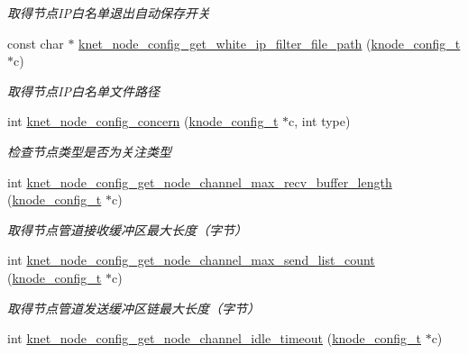 \begin{DoxyCompactItemize}
\begin{DoxyCompactList}\small\item\em 取得节点\+I\+P白名单退出自动保存开关 \end{DoxyCompactList}\item 
const char $\ast$ \hyperlink{a00105_a9988701f828169b05138ec5cfd7b2016_a9988701f828169b05138ec5cfd7b2016}{knet\+\_\+node\+\_\+config\+\_\+get\+\_\+white\+\_\+ip\+\_\+filter\+\_\+file\+\_\+path} (\hyperlink{a00066_af1cfaee0eb1c76ebf06076b95cc47ee1_af1cfaee0eb1c76ebf06076b95cc47ee1}{knode\+\_\+config\+\_\+t} $\ast$c)
\begin{DoxyCompactList}\small\item\em 取得节点\+I\+P白名单文件路径 \end{DoxyCompactList}\item 
int \hyperlink{a00105_a255581334b8d1d5a530374c4e979d941_a255581334b8d1d5a530374c4e979d941}{knet\+\_\+node\+\_\+config\+\_\+concern} (\hyperlink{a00066_af1cfaee0eb1c76ebf06076b95cc47ee1_af1cfaee0eb1c76ebf06076b95cc47ee1}{knode\+\_\+config\+\_\+t} $\ast$c, int type)
\begin{DoxyCompactList}\small\item\em 检查节点类型是否为关注类型 \end{DoxyCompactList}\item 
int \hyperlink{a00105_a646e4715ce4e9b24f5c3da98dd9172ec_a646e4715ce4e9b24f5c3da98dd9172ec}{knet\+\_\+node\+\_\+config\+\_\+get\+\_\+node\+\_\+channel\+\_\+max\+\_\+recv\+\_\+buffer\+\_\+length} (\hyperlink{a00066_af1cfaee0eb1c76ebf06076b95cc47ee1_af1cfaee0eb1c76ebf06076b95cc47ee1}{knode\+\_\+config\+\_\+t} $\ast$c)
\begin{DoxyCompactList}\small\item\em 取得节点管道接收缓冲区最大长度（字节） \end{DoxyCompactList}\item 
int \hyperlink{a00105_abe92a4dcbd1299b2758da26455cb6c68_abe92a4dcbd1299b2758da26455cb6c68}{knet\+\_\+node\+\_\+config\+\_\+get\+\_\+node\+\_\+channel\+\_\+max\+\_\+send\+\_\+list\+\_\+count} (\hyperlink{a00066_af1cfaee0eb1c76ebf06076b95cc47ee1_af1cfaee0eb1c76ebf06076b95cc47ee1}{knode\+\_\+config\+\_\+t} $\ast$c)
\begin{DoxyCompactList}\small\item\em 取得节点管道发送缓冲区链最大长度（字节） \end{DoxyCompactList}\item 
int \hyperlink{a00105_aabef62af3c7a8b52c4943c0b30f70705_aabef62af3c7a8b52c4943c0b30f70705}{knet\+\_\+node\+\_\+config\+\_\+get\+\_\+node\+\_\+channel\+\_\+idle\+\_\+timeout} (\hyperlink{a00066_af1cfaee0eb1c76ebf06076b95cc47ee1_af1cfaee0eb1c76ebf06076b95cc47ee1}{knode\+\_\+config\+\_\+t} $\ast$c)

\end{DoxyCompactItemize}
